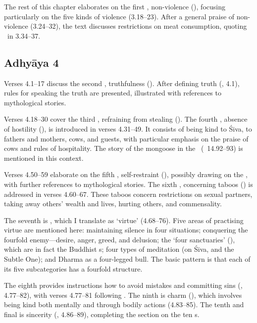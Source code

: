 The rest of this chapter elaborates on the first , 
non-violence (), focusing particularly on the five kinds of violence (3.18--23).
After a general praise of non-violence (3.24--32), the text discusses restrictions
on meat consumption, quoting \Manu\ in 3.34--37.


\subsection*{Adhyāya 4}\label{contents_of_ch04}
Verses 4.1--17 discuss the second , truthfulness (). 
After defining truth (, 4.1), rules for speaking the truth are presented,
illustrated with references to mythological stories. 

Verses 4.18--30 cover the third 
, refraining from stealing (). 
The fourth , absence of hostility (), is 
introduced in verses 4.31--49. It consists of being kind to Śiva, 
to fathers and mothers, cows, and guests,
with particular emphasis on the praise of cows and rules of hospitality.  
The story of the mongoose in the \MBH\ (\MBH\ 14.92--93)
is mentioned in this context.

Verses 4.50--59 elaborate on the fifth ,
self-restraint (), possibly drawing on the 
\Buddhacarita,  with further references to mythological stories.
The sixth , concerning taboos () is addressed in verses 4.60--67.
These taboos concern restrictions on sexual partners, taking away others' wealth and
lives, hurting others, and commensality.

The seventh  is , which I translate as `virtue' (4.68--76).
Five areas of practising virtue are mentioned here: 
maintaining silence in four situations;
conquering the fourfold enemy---desire, anger, greed, and delusion;
the `four sanctuaries' (), which are in fact the
Buddhist s; four types of meditation (on 
Śiva, and the Subtle One); and Dharma as a four-legged bull. The
basic pattern is that each of its five subcategories has a fourfold structure.

The eighth  provides instructions how to avoid mistakes and committing sins
(, 4.77--82), with verses 4.77--81 following \Manu.
The ninth  is charm (), which involves being kind both mentally
and through bodily actions (4.83--85). 
The tenth and final  is sincerity (, 4.86--89),
completing the section on the ten s.



